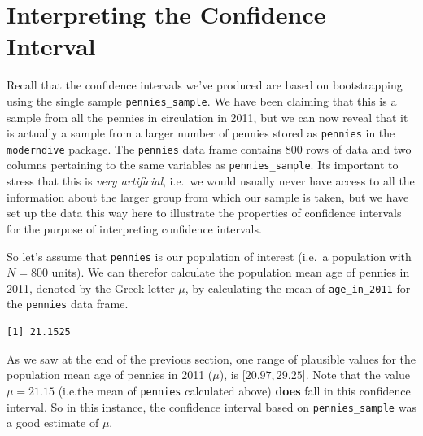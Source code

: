 \documentclass[]{article}
\newenvironment{Shaded}{\begin{snugshade}}{\end{snugshade}}
\newcommand{\KeywordTok}[1]{\textcolor[rgb]{0.13,0.29,0.53}{\textbf{#1}}}
\newcommand{\DataTypeTok}[1]{\textcolor[rgb]{0.13,0.29,0.53}{#1}}
\newcommand{\DecValTok}[1]{\textcolor[rgb]{0.00,0.00,0.81}{#1}}
\newcommand{\StringTok}[1]{\textcolor[rgb]{0.31,0.60,0.02}{#1}}
\newcommand{\CommentTok}[1]{\textcolor[rgb]{0.56,0.35,0.01}{\textit{#1}}}
\newcommand{\OperatorTok}[1]{\textcolor[rgb]{0.81,0.36,0.00}{\textbf{#1}}}
\newcommand{\NormalTok}[1]{#1}
\begin{document}
\section{Interpreting the Confidence
Interval}\label{interpreting-the-confidence-interval}

Recall that the confidence intervals we've produced are based on
bootstrapping using the single sample \texttt{pennies\_sample}. We have
been claiming that this is a sample from all the pennies in circulation
in 2011, but we can now reveal that it is actually a sample from a
larger number of pennies stored as \texttt{pennies} in the
\texttt{moderndive} package. The \texttt{pennies} data frame contains
800 rows of data and two columns pertaining to the same variables as
\texttt{pennies\_sample}. Its important to stress that this is
\emph{very artificial}, i.e.~we would usually never have access to all
the information about the larger group from which our sample is taken,
but we have set up the data this way here to illustrate the properties
of confidence intervals for the purpose of interpreting confidence
intervals.

So let's assume that \texttt{pennies} is our population of interest
(i.e.~a population with \(N=800\) units). We can therefor calculate the
population mean age of pennies in 2011, denoted by the Greek letter
\(\mu\), by calculating the mean of \texttt{age\_in\_2011} for the
\texttt{pennies} data frame.

\begin{Shaded}
\end{Shaded}

\begin{verbatim}
[1] 21.1525
\end{verbatim}

As we saw at the end of the previous section, one range of plausible
values for the population mean age of pennies in 2011 (\(\mu\)), is
{[}\(20.97,29.25\){]}. Note that the value \(\mu=21.15\) (i.e.the mean
of \texttt{pennies} calculated above) \textbf{does} fall in this
confidence interval. So in this instance, the confidence interval based
on \texttt{pennies\_sample} was a good estimate of \(\mu\).
\end{document}
